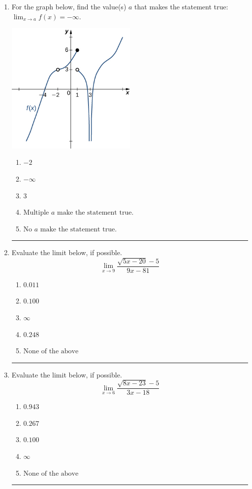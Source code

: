 \documentclass[14pt]{extbook}
\newcommand{\litem}[1]{\item#1\hspace*{-1cm}\rule{\textwidth}{0.4pt}}
\begin{document}
\begin{enumerate}
{\begin{enumerate}[label=\Alph*.]
\end{enumerate} }
\litem{
For the graph below, find the value(s) $a$ that makes the statement true: $ \displaystyle \lim_{x \rightarrow a} f(x) = -\infty$.
\begin{center}
    \includegraphics[width=0.5\textwidth]{../Figures/evaluateLimitGraphicallyCopyC.png}
\end{center}
\begin{enumerate}[label=\Alph*.]
\item \( -2 \)
\item \( -\infty \)
\item \( 3 \)
\item \( \text{Multiple } a \text{ make the statement true}. \)
\item \( \text{No } a \text{ make the statement true}. \)

\end{enumerate} }
\litem{
Evaluate the limit below, if possible.\[ \lim_{x \rightarrow 9} \frac{\sqrt{5x - 20} - 5}{9x - 81} \]\begin{enumerate}[label=\Alph*.]
\item \( 0.011 \)
\item \( 0.100 \)
\item \( \infty \)
\item \( 0.248 \)
\item \( \text{None of the above} \)

\end{enumerate} }
\litem{
Evaluate the limit below, if possible.\[ \lim_{x \rightarrow 6} \frac{\sqrt{8x - 23} - 5}{3x - 18} \]\begin{enumerate}[label=\Alph*.]
\item \( 0.943 \)
\item \( 0.267 \)
\item \( 0.100 \)
\item \( \infty \)
\item \( \text{None of the above} \)


\end{enumerate}}
\end{enumerate}
\end{document}
